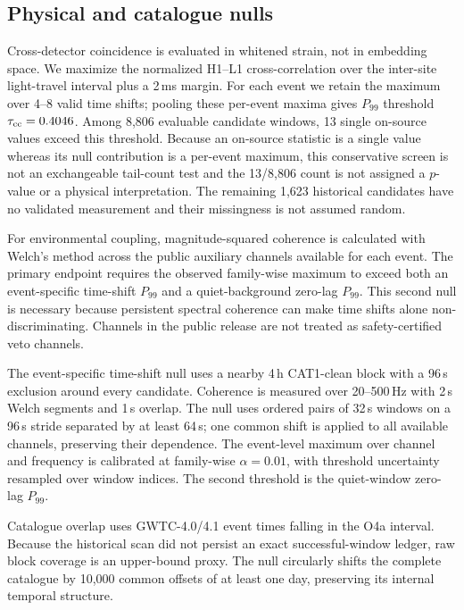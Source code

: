 \documentclass[aps,prd,twocolumn,superscriptaddress,nofootinbib,amsmath,amssymb,floatfix,10pt]{revtex4-2}
\begin{document}
\subsection{Physical and catalogue nulls}

Cross-detector coincidence is evaluated in whitened strain, not in embedding
space.  We maximize the normalized H1--L1 cross-correlation over the
inter-site light-travel interval plus a 2\,ms margin.  For each event we retain
the maximum over 4--8 valid time shifts; pooling these per-event maxima gives
$P_{99}$ threshold $\tau_{\rm cc}=0.4046$.  Among 8,806 evaluable candidate
windows, 13 single on-source values exceed this threshold.  Because an
on-source statistic is a single value whereas its null contribution is a
per-event maximum, this conservative screen is not an exchangeable tail-count
test and the 13/8,806 count is not assigned a $p$-value or a physical
interpretation.  The remaining 1,623 historical candidates have no validated
measurement and their missingness is not assumed random.

For environmental coupling, magnitude-squared coherence is calculated with
Welch's method \cite{welch1967} across the public auxiliary channels available
for each event.  The primary endpoint requires the observed family-wise maximum
to exceed both an event-specific time-shift $P_{99}$ and a quiet-background
zero-lag $P_{99}$.  This second null is necessary because persistent spectral
coherence can make time shifts alone non-discriminating.  Channels in the
public release are not treated as safety-certified veto channels.

The event-specific time-shift null uses a nearby 4\,h CAT1-clean block with a
96\,s exclusion around every candidate.  Coherence is measured over
20--500\,Hz with 2\,s Welch segments and 1\,s overlap.  The null uses ordered
pairs of 32\,s windows on a 96\,s stride separated by at least 64\,s; one common
shift is applied to all available channels, preserving their dependence.  The
event-level maximum over channel and frequency is calibrated at family-wise
$\alpha=0.01$, with threshold uncertainty resampled over window indices.  The
second threshold is the quiet-window zero-lag $P_{99}$.

Catalogue overlap uses GWTC-4.0/4.1 event times falling in the O4a interval.
Because the historical scan did not persist an exact successful-window ledger,
raw block coverage is an upper-bound proxy.  The null circularly shifts the
complete catalogue by 10,000 common offsets of at least one day, preserving
its internal temporal structure.
\end{document}
